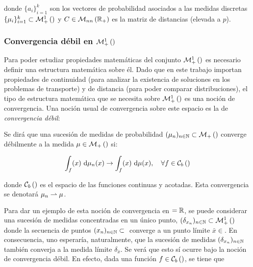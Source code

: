 donde $\{a_i\}_{i=1}^k$ son los vectores de probabilidad asociados a las medidas discretas $\{\mu_i\}_{i=1}^k\subset\mathcal{M}_+^1\left(\right)$ y $C\in\mathcal{M}_{nn}\left(\mathbb{R}_+\right)$ es la matriz de distancias (elevada a $p$).

\subsubsection{Convergencia débil en \texorpdfstring{$\mathcal{M}_+^1\left(\right)$}{el espacio de medidas de probabilidad}}

Para poder estudiar propiedades matemáticas del conjunto $\mathcal{M}_+^1\left(\right)$ es necesario definir una estructura matemática sobre él. Dado que en este trabajo importan propiedades de continuidad (para analizar la existencia de soluciones en los problemas de transporte) y de distancia (para poder comparar distribuciones), el tipo de estructura matemática que se necesita sobre $\mathcal{M}_+^1\left(\right)$ es una noción de convergencia. Una noción usual de convergencia sobre este espacio es la de \textit{convergencia débil}:

\begin{defn}
	\label{defn:measure_weak_convergence}
	Se dirá que una sucesión de medidas de probabilidad $(\mu_n)_{n\in\mathbb{N}}\subset\mathcal{M}_+\left(\right)$ converge débilmente a la medida $\mu\in\mathcal{M}_+\left(\right)$ si:

	\begin{equation*}
		\label{eq:measure_weak_convergence}
		\int_ f(x) \,\operatorname{d}\!\mu_n(x) \to \int_ f(x) \,\operatorname{d}\!\mu(x),
		\quad\forall f\in\mathcal{C}_b\left(\right)
	\end{equation*}

	donde $\mathcal{C}_b\left(\right)$ es el espacio de las funciones continuas y acotadas. Esta convergencia se denotará $\mu_n\rightharpoonup\mu$.
\end{defn}

Para dar un ejemplo de esta noción de convergencia en $=\mathbb{R}$, se puede considerar una sucesión de medidas concentradas en un único punto, $(\delta_{x_n})_{n\in\mathbb{N}}\subset\mathcal{M}_+^1\left(\right)$ donde la secuencia de puntos $(x_n)_{n\in\mathbb{N}}\subset{}$ converge a un punto límite $\bar x\in\xspace$. En consecuencia, uno esperaría, naturalmente, que la sucesión de medidas $(\delta_{x_n})_{n\in\mathbb{N}}$ también converja a la medida límite $\delta_{\bar x}$. Se verá que esto sí ocurre bajo la noción de convergencia débil. En efecto, dada una función $f\in\mathcal{C}_b\left(\right)$, se tiene que

